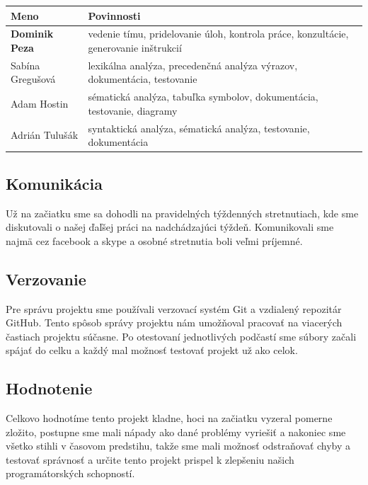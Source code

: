 \documentclass [11pt, a4paper]{article}
\begin{document}
\begin{table}[H]
\centering
\begin{tabular}{|l|l|}
\hline
Meno & Povinnosti\\ \hline
\textbf{Dominik Peza} & vedenie tímu, pridelovanie úloh, kontrola práce, konzultácie, generovanie inštrukcií\\
Sabína Gregušová & lexikálna analýza, precedenčná analýza výrazov, dokumentácia, testovanie\\
Adam Hostin & sématická analýza, tabuľka symbolov, dokumentácia, testovanie, diagramy\\
Adrián Tulušák & syntaktická analýza, sématická analýza, testovanie, dokumentácia\\
\hline
\end{tabular}
\end{table}

\subsection{Komunikácia}
Už na začiatku sme sa dohodli na pravidelných týždenných stretnutiach, kde sme diskutovali o našej ďaľšej práci na nadchádzajúci týždeň. Komunikovali sme najmä cez facebook a skype a osobné stretnutia boli veľmi príjemné. 

\subsection{Verzovanie}
Pre správu projektu sme používali verzovací systém Git a vzdialený repozitár GitHub. Tento spôsob správy projektu nám umožňoval pracovať na viacerých častiach projektu súčasne. Po otestovaní jednotlivých podčastí sme súbory začali spájať do celku a každý mal možnosť testovať projekt už ako celok.

\subsection{Hodnotenie}
Celkovo hodnotíme tento projekt kladne, hoci na začiatku vyzeral pomerne zložito, postupne sme mali nápady ako dané problémy vyriešiť a nakoniec sme všetko stihli v časovom predstihu, takže sme mali možnosť odstraňovať chyby a testovať správnosť a určite tento projekt prispel k zlepšeniu našich programátorských schopností.
\newpage

\renewcommand{\refname}{Použitá literatúra}


\newpage
\appendix
\end{document}
